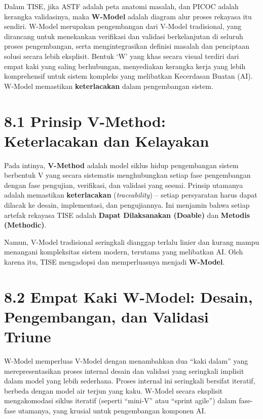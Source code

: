 \documentclass[
  letterpaper,
  DIV=11,
  numbers=noendperiod]{scrreprt}
\begin{document}
Dalam TISE, jika ASTF adalah peta anatomi masalah, dan PICOC adalah
kerangka validasinya, maka \textbf{W-Model} adalah diagram alur proses
rekayasa itu sendiri. W-Model merupakan pengembangan dari V-Model
tradisional, yang dirancang untuk menekankan verifikasi dan validasi
berkelanjutan di seluruh proses pengembangan, serta mengintegrasikan
definisi masalah dan penciptaan solusi secara lebih eksplisit. Bentuk
`W' yang khas secara visual terdiri dari empat kaki yang saling
berhubungan, menyediakan kerangka kerja yang lebih komprehensif untuk
sistem kompleks yang melibatkan Kecerdasan Buatan (AI). W-Model
memastikan \textbf{keterlacakan} dalam pengembangan sistem.

\section{\texorpdfstring{\textbf{8.1 Prinsip V-Method: Keterlacakan dan
Kelayakan}}{8.1 Prinsip V-Method: Keterlacakan dan Kelayakan}}\label{prinsip-v-method-keterlacakan-dan-kelayakan}

Pada intinya, \textbf{V-Method} adalah model siklus hidup pengembangan
sistem berbentuk V yang secara sistematis menghubungkan setiap fase
pengembangan dengan fase pengujian, verifikasi, dan validasi yang
sesuai. Prinsip utamanya adalah memastikan \textbf{keterlacakan}
(\emph{traceability}) -- setiap persyaratan harus dapat dilacak ke
desain, implementasi, dan pengujiannya. Ini menjamin bahwa setiap
artefak rekayasa TISE adalah \textbf{Dapat Dilaksanakan (Doable)} dan
\textbf{Metodis (Methodic)}.

Namun, V-Model tradisional seringkali dianggap terlalu linier dan kurang
mampu menangani kompleksitas sistem modern, terutama yang melibatkan AI.
Oleh karena itu, TISE mengadopsi dan memperluasnya menjadi
\textbf{W-Model}.

\section{\texorpdfstring{\textbf{8.2 Empat Kaki W-Model: Desain,
Pengembangan, dan Validasi
Triune}}{8.2 Empat Kaki W-Model: Desain, Pengembangan, dan Validasi Triune}}\label{empat-kaki-w-model-desain-pengembangan-dan-validasi-triune}

W-Model memperluas V-Model dengan menambahkan dua ``kaki dalam'' yang
merepresentasikan proses internal desain dan validasi yang seringkali
implisit dalam model yang lebih sederhana. Proses internal ini
seringkali bersifat iteratif, berbeda dengan model air terjun yang kaku.
W-Model secara eksplisit mengakomodasi siklus iteratif (seperti
``mini-V'' atau ``sprint agile'') dalam fase-fase utamanya, yang krusial
untuk pengembangan komponen AI.
\end{document}
